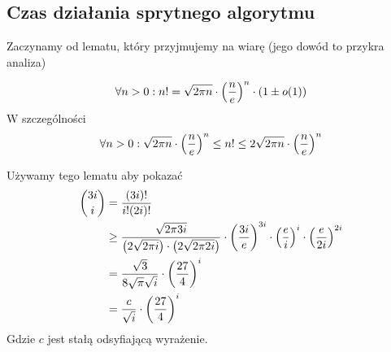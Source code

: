 \subsection{Czas działania sprytnego algorytmu}
Zaczynamy od lematu, który przyjmujemy na wiarę (jego dowód to przykra analiza)
\begin{lemma}
    \[
        \forall n > 0: n! = \sqrt{2\pi n}\cdot\left(\frac{n}{e}\right)^n \cdot (1 \pm o(1))
    \]
    W szczególności
    \[
        \forall n > 0: \sqrt{2\pi n}\cdot\left(\frac{n}{e}\right)^n \leq n! \leq 2\sqrt{2\pi n}\cdot\left(\frac{n}{e}\right)^n
    \]
\end{lemma}
Używamy tego lematu aby pokazać
\begin{align*}
    \binom{3i}{i}
        &= \frac{(3i)!}{i!(2i)!} \\
        &\geq \frac{\sqrt{2\pi 3i}}{\left(2\sqrt{2 \pi i}\right) \cdot \left(2\sqrt{2 \pi 2i}\right)}
            \cdot \left(\frac{3i}{e}\right)^{3i} \cdot \left(\frac{e}{i}\right)^i \cdot \left(\frac{e}{2i}\right)^{2i} \\
        &= \frac{\sqrt{3}}{8\sqrt{\pi}\sqrt{i}} \cdot \left(\frac{27}{4}\right)^i \\
        &= \frac{c}{\sqrt{i}}\cdot \left(\frac{27}{4}\right)^i
\end{align*}
Gdzie \( c \) jest stałą odsyfiającą wyrażenie.

